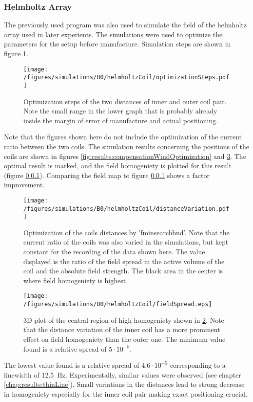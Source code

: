         \subsubsection{Helmholtz Array}
        The previously used program was also used to simulate the field of the helmholtz array used in later experients. The simulations were used to optimize the parameters for the setup before manufacture. Simulation steps are shown in figure \ref{fig:results:optimizationSteps}.
        \begin{figure}
            \centering
            \texttt{[image: /figures/simulations/B0/helmholtzCoil/optimizationSteps.pdf]}
            \caption{Optimization steps of the two distances of inner and outer coil pair. Note the small range in the lower graph that is probably already inside the margin of error of manufacture and actual positioning.}
            \label{fig:results:optimizationSteps}
        \end{figure}
        Note that the figures shown here do not include the optimization of the current ratio between the two coils. The simulation results concerning the positions of the coils are shown in figures \ref{fig:results:compensationWindOptimization} and \ref{fig:results:fieldSpread}. The optimal result is marked, and the field homogeniety is plotted for this result (figure \ref{}). Comparing the field map to figure \ref{} shows a factor  improvement.
        \begin{figure}
           \centering
           \texttt{[image: /figures/simulations/B0/helmholtzCoil/distanceVariation.pdf]}
           \label{fig:results:distanceVariation}
           \caption{Optimization of the coils distances by 'fminsearchbnd'. Note that the current ratio of the coils was also varied in the simulations, but kept constant for the recording of the data shown here. The value displayed is the ratio of the field spread in the active volume of the coil and the absolute field strength. The black area in the center is where field homogeniety is highest.}
        \end{figure}
        \begin{figure}
            \texttt{[image: /figures/simulations/B0/helmholtzCoil/fieldSpread.eps]}
            \label{fig:results:fieldSpread}
            \caption{3D plot of the central region of high homogeniety shown in \ref{fig:results:distanceVariation}. Note that the distance variation of the inner coil has a more prominent effect on field homogeniety than the outer one. The minimum value found is a relative spread of $5\cdot 10^{-5}$.}
        \end{figure}
        The lowest value found is a relative spread of $4.6 \cdot 10^{-5}$ corresponding to a linewidth of \SI{12.5}{\hertz}. Experimentally, similar values were observed (see chapter \ref{chap:results:thinLine}). Small variations in the distances lead to strong decrease in homogeniety especially for the inner coil pair making exact positioning crucial.
%
